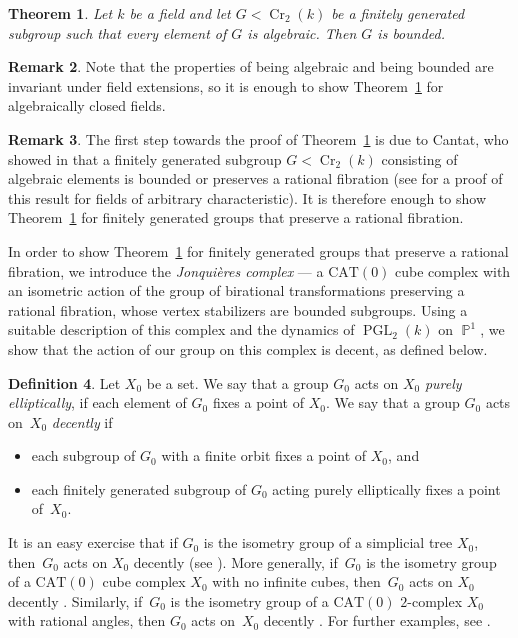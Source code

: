 \documentclass[JEP,XML,SOM,Unicode, NoEqCountersInSection,published]{cedram}
\newcommand{\p}{\operatorname{\mathbb{P}}}\let\P\p
\newcommand{\Cr}{\operatorname{Cr}}
\newcommand{\PGL}{\operatorname{PGL}}
\theoremstyle{plain}
\newtheorem{theorem}{Theorem}[section]
\theoremstyle{definition}
\newtheorem{definition}[theorem]{Definition}
\newtheorem{remark}[theorem]{Remark}
\begin{document}
\begin{theorem}\label{thm:main}
{Let $k$ be a field and} let $G<\Cr_2(k)$ be a finitely generated subgroup such that every element of $G$ is algebraic. Then $G$ is bounded.
\end{theorem}

\begin{remark}\label{rmk_alg_closed_fields}
Note that the properties of being algebraic and being bounded are invariant under field extensions, so it is enough to show Theorem~\ref{thm:main} for algebraically closed fields.
\end{remark}

\begin{remark}\label{rmk_redu_Cantat}
The first step towards the proof of Theorem~\ref{thm:main} is due to Cantat, who showed in \cite{Cantat_groupes_birat} that a finitely generated subgroup $G<\Cr_2(k)$ consisting of algebraic elements is bounded or preserves a rational fibration (see \cite{Lamy_Cremona} for a proof of this result for fields of arbitrary characteristic). It is therefore enough to show Theorem~\ref{thm:main} for finitely generated groups that preserve a rational fibration.
\end{remark}

{In order to show Theorem~\ref{thm:main} for finitely generated groups that preserve a rational fibration}, we introduce the \emph{Jonquières complex} --- a $\mathrm{CAT}(0)$ cube complex with an isometric action of the group of birational transformations preserving a rational fibra\-tion, whose vertex stabilizers are bounded subgroups. Using a suitable description of this complex and the dynamics of $\PGL_2(k)$ on $\p^1$, we show that the action of our group on this complex is decent, as defined below.

\begin{definition}
\label{def:decent}
Let $X_0$ be a set. We say that a group $G_0$ acts on $X_0$ \emph{purely elliptically}, if each element of $G_0$ fixes a point of $X_0$. We say that a group $G_0$ acts on~$X_0$ \emph{decently} if
\begin{itemize}
\item
each subgroup of $G_0$ with a finite orbit fixes a point of $X_0$, and
\item
each finitely generated subgroup of $G_0$ acting purely elliptically fixes a point of~$X_0$.
\end{itemize}
\end{definition}

It is an easy exercise
that if $G_0$ is the isometry group of a simplicial tree $X_0$, then~$G_0$ acts on $X_0$ decently {(see \cite[Cor.\,3 in \S6.5 \& Ex.\,6.3.4]{Serre})}. More generally, if~$G_0$ is the isometry group of a $\mathrm{CAT}(0)$ cube complex $X_0$ with no infinite cubes, then~$G_0$ acts on $X_0$ decently \cite{GLU_Neretin}. Similarly, if~$G_0$ is the isometry group of a $\mathrm{CAT}(0)$ $2$-complex $X_0$ with rational angles, then $G_0$ acts on~$X_0$ decently \cite{NOP}. For further examples, see \cite{HO}.
\end{document}

